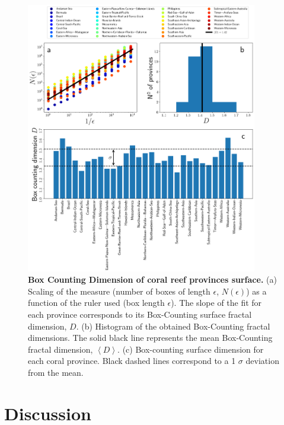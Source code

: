\begin{figure}[H]
    \centering
    \includegraphics[width=0.9\textwidth]{Figures/Box_Counting_Dimensions.pdf}
    \caption[Box Counting Dimension of coral reef provinces
        surface]{\textbf{Box
            Counting Dimension of coral reef provinces surface.} (a)
        Scaling of the measure (number of boxes of length $\epsilon$,
        $N(\epsilon)$) as a function of the ruler used (box length $\epsilon$).
        The slope of the fit for each province corresponds to its Box-Counting
        surface fractal dimension, $D$. (b) Histogram of the obtained
        Box-Counting fractal dimensions. The solid black line represents the
        mean Box-Counting fractal dimension, $\left<D\right>$. (c) Box-counting
        surface dimension for each coral province. Black dashed lines
        correspond to a 1 $\sigma$ deviation from the mean.}
    \label{fig:Box_Counting_Dimension}
\end{figure}

\section{Discussion}

